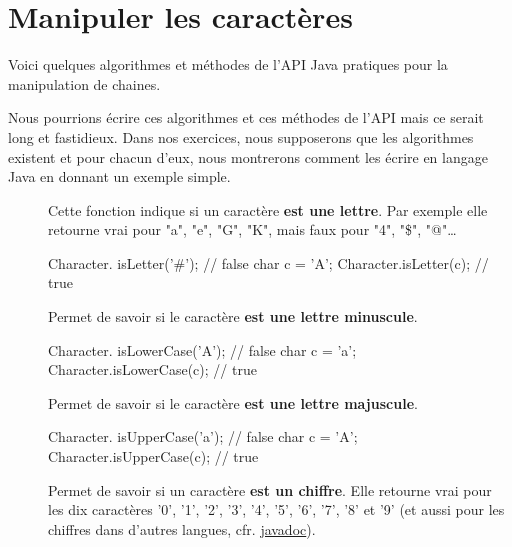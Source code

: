 \section{Manipuler les caractères}

	Voici quelques algorithmes et méthodes de l'API Java  pratiques 
	pour la manipulation de chaines. 

	Nous pourrions écrire ces algorithmes et ces méthodes de l'API mais ce serait
	long et fastidieux. Dans nos exercices, nous supposerons que les algorithmes
	existent et pour chacun d'eux, nous montrerons comment les écrire en langage
	Java en donnant un exemple simple. 
	
	\begin{description}
	
		\item[]
			Cette fonction indique si un caractère \textbf{est une lettre}. 
		Par exemple elle retourne vrai pour "a", "e", "G", "K", 
		mais faux pour "4", "\$", "@"\dots %


		\begin{java}
Character. isLetter('#');  // false
char c = 'A';
Character.isLetter(c);   // true			
		\end{java}
	
	
	\item[]	
		Permet de savoir si le caractère \textbf{est une lettre minuscule}.


		\begin{java}
Character. isLowerCase('A');  // false
char c = 'a';
Character.isLowerCase(c);   // true			
		\end{java}

	\item[]	
		Permet de savoir si le caractère \textbf{est une lettre majuscule}.
		

		\begin{java}
Character. isUpperCase('a');  // false
char c = 'A';
Character.isUpperCase(c);   // true			
		\end{java}
	

	\item[]	
		Permet de savoir si un caractère \textbf{est un chiffre}. 
		Elle retourne vrai pour les dix caractères 
		'0', '1', '2', '3', '4', '5', '6', '7', '8' et '9'
		(et aussi pour les chiffres dans d'autres langues, cfr. 
		\href{https://docs.oracle.com/javase/9/docs/api/java/lang/Character.html\#isDigit-char-}{javadoc}).


\end{description}
